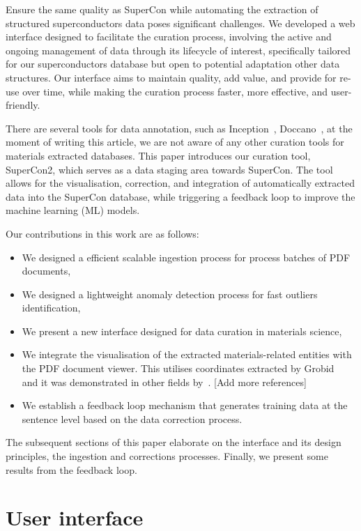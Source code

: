 \documentclass[a4paper]{article}
\begin{document}
Ensure the same quality as SuperCon while automating the extraction of structured superconductors data poses significant challenges. 
We developed a web interface designed to facilitate the curation process, involving the active and ongoing management of data through its lifecycle of interest, specifically tailored for our superconductors database but open to potential adaptation other data structures. 
Our interface aims to maintain quality, add value, and provide for re-use over time, while making the curation process faster, more effective, and user-friendly.

There are several tools for data annotation, such as Inception~\cite{klie-etal-2018-inception}, Doccano~\cite{doccano}, at the moment of writing this article, we are not aware of any other curation tools for materials extracted databases. 
This paper introduces our curation tool, SuperCon2, which serves as a data staging area towards SuperCon. The tool allows for the visualisation, correction, and integration of automatically extracted data into the SuperCon database, while triggering a feedback loop to improve the machine learning (ML) models.

Our contributions in this work are as follows:
\begin{itemize}
    \item We designed a efficient scalable ingestion process for process batches of PDF documents,
    \item We designed a lightweight anomaly detection process for fast outliers identification, 
    \item We present a new interface designed for data curation in materials science, 
    \item We integrate the visualisation of the extracted materials-related entities with the PDF document viewer. This utilises coordinates extracted by Grobid~\cite{GROBID} and it was demonstrated in other fields by~\cite{wang2022hammer}. [Add more references] 
    \item We establish a feedback loop mechanism that generates training data at the sentence level based on the data correction process.
\end{itemize}

The subsequent sections of this paper elaborate on the interface and its design principles, the ingestion and corrections processes. Finally, we present some results from the feedback loop. 

\section{User interface}
\end{document}
